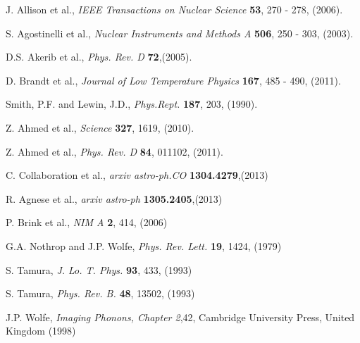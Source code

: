\documentclass[preprint,12pt]{elsarticle}
\begin{document}
%
%
\begin{thebibliography}{99}

J. Allison et al., {\it IEEE Transactions on Nuclear Science} \textbf{53}, 270 - 278, (2006).

S. Agostinelli et al., {\it Nuclear Instruments and Methods A} \textbf{506}, 250 - 303, (2003).

D.S. Akerib et al., {\it Phys. Rev. D} \textbf{72},(2005).

D. Brandt et al., {\it Journal of Low Temperature Physics} \textbf{167}, 485 - 490, (2011).

Smith, P.F. and Lewin, J.D., {\it Phys.Rept.} \textbf{187}, 203, (1990).


Z. Ahmed et al., {\it Science} \textbf{327}, 1619, (2010).

Z. Ahmed et al., {\it Phys. Rev. D} \textbf{84}, 011102, (2011).

C. Collaboration et al., {\it arxiv astro-ph.CO} \textbf{1304.4279},(2013)

R. Agnese et al., {\it arxiv astro-ph} \textbf{1305.2405},(2013)





P. Brink et al., {\it NIM A} \textbf{2}, 414, (2006)


G.A. Nothrop and J.P. Wolfe, {\it Phys. Rev. Lett.} \textbf{19}, 1424, (1979)

S. Tamura, {\it J. Lo. T. Phys.} \textbf{93}, 433, (1993)

S. Tamura, {\it Phys. Rev. B.} \textbf{48}, 13502, (1993)

J.P. Wolfe, {\it Imaging Phonons, Chapter 2},42, Cambridge University Press, United Kingdom (1998) 


\end{thebibliography}
\end{document}

